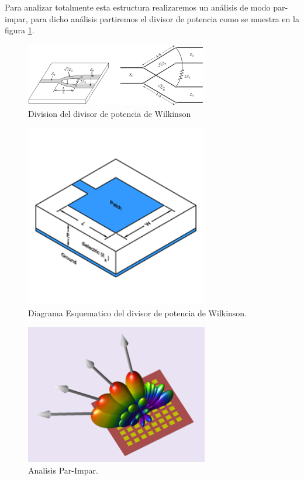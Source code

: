 \documentclass[a4paper]{IEEEtran} %
\begin{document}
Para analizar totalmente esta estructura realizaremos un análisis de modo par-impar, para dicho análisis partiremos el divisor de potencia como se muestra en la figura \ref{fig:Analisis}.
\vspace{50mm}
\begin{figure}[h]
    \centering
        \includegraphics[width=8cm]{imagenes/img17}
        \caption{Division del divisor de potencia de Wilkinson}
        \label{fig:Analisis}
\end{figure}
\begin{figure}[h]
    \centering
    \includegraphics[width=8cm]{imagenes/img3}
    \caption{Diagrama Esquematico del divisor de potencia de Wilkinson.}
    \label{fig:diagrama}
\end{figure}
\begin{figure}[h]    
    \centering
        \includegraphics[width=8cm]{imagenes/img4}
        \caption{Analisis Par-Impar.}
        \label{fig:analisis-par-impar}
\end{figure}
\end{document}
